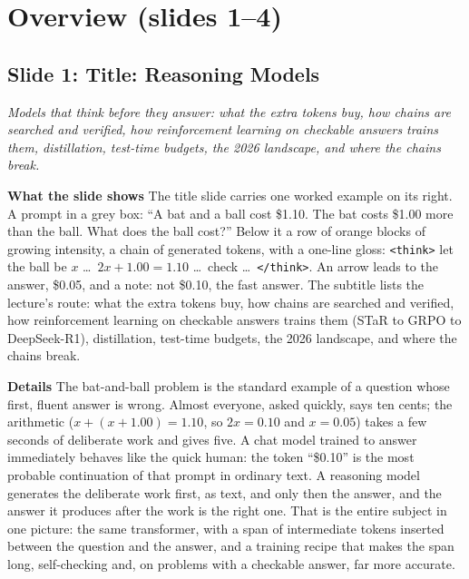 \documentclass[11pt,letterpaper]{article}
\newcommand{\slide}[3]{%
  \subsection[Slide #1: #2]{Slide #1: #2}%
  {\color{muted}\itshape #3\par}\medskip}
\newcommand{\para}[1]{\medskip\noindent\textbf{#1}\quad}
\begin{document}
\section{Overview (slides 1--4)}

\slide{1}{Title: Reasoning Models}{Models that think before they answer: what the extra tokens buy, how chains are searched and verified, how reinforcement learning on checkable answers trains them, distillation, test-time budgets, the 2026 landscape, and where the chains break.}

\para{What the slide shows} The title slide carries one worked example on its right. A prompt in a grey box: ``A bat and a ball cost \$1.10. The bat costs \$1.00 more than the ball. What does the ball cost?'' Below it a row of orange blocks of growing intensity, a chain of generated tokens, with a one-line gloss: \texttt{<think>} let the ball be $x$ \ldots\ $2x+1.00=1.10$ \ldots\ check \ldots\ \texttt{</think>}. An arrow leads to the answer, \$0.05, and a note: not \$0.10, the fast answer. The subtitle lists the lecture's route: what the extra tokens buy, how chains are searched and verified, how reinforcement learning on checkable answers trains them (STaR to GRPO to DeepSeek-R1), distillation, test-time budgets, the 2026 landscape, and where the chains break.

\para{Details} The bat-and-ball problem is the standard example of a question whose first, fluent answer is wrong. Almost everyone, asked quickly, says ten cents; the arithmetic ($x + (x+1.00) = 1.10$, so $2x = 0.10$ and $x = 0.05$) takes a few seconds of deliberate work and gives five. A chat model trained to answer immediately behaves like the quick human: the token ``\$0.10'' is the most probable continuation of that prompt in ordinary text. A reasoning model generates the deliberate work first, as text, and only then the answer, and the answer it produces after the work is the right one. That is the entire subject in one picture: the same transformer, with a span of intermediate tokens inserted between the question and the answer, and a training recipe that makes the span long, self-checking and, on problems with a checkable answer, far more accurate.
\end{document}
